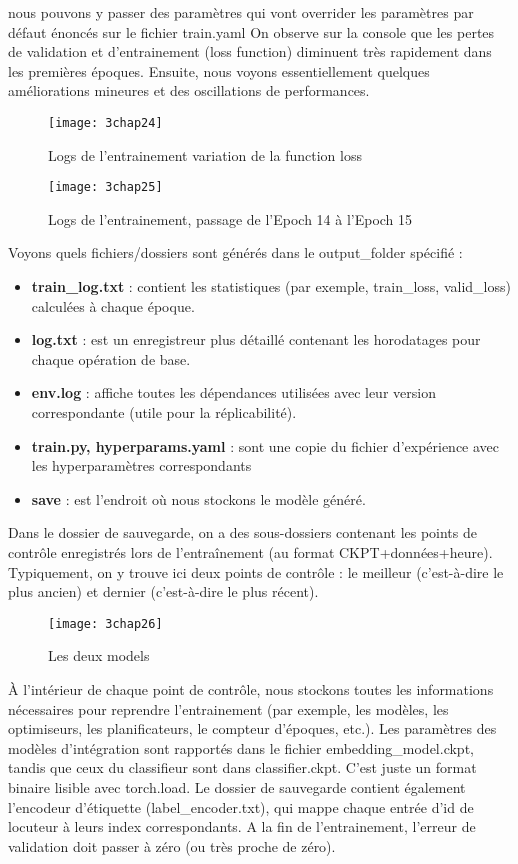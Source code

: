 nous pouvons y passer des paramètres qui vont overrider les paramètres par défaut énoncés sur le fichier train.yaml
On observe sur la console que les pertes de validation et d’entrainement (loss function) diminuent très rapidement dans les premières époques. Ensuite, nous voyons essentiellement quelques améliorations mineures et des oscillations de performances.
\begin{figure}[h]
	\centering
	\texttt{[image: 3chap24]}
	\caption{Logs de l’entrainement variation de la function loss}
	\label{fig:3chap24}
\end{figure}

\begin{figure}[h]
	\centering
	\texttt{[image: 3chap25]}
	\caption{Logs de l’entrainement, passage de l’Epoch 14 à l’Epoch 15}
	\label{fig:3chap25}
\end{figure}

Voyons quels fichiers/dossiers sont générés dans le output\_folder spécifié :
\begin{itemize}
    \item \textbf{train\_log.txt} : contient les statistiques (par exemple, train\_loss, valid\_loss) calculées à chaque époque.
    \item \textbf{log.txt} : est un enregistreur plus détaillé contenant les horodatages pour chaque opération de base.
    \item \textbf{env.log} : affiche toutes les dépendances utilisées avec leur version correspondante (utile pour la réplicabilité).
    \item \textbf{train.py, hyperparams.yaml }: sont une copie du fichier d'expérience avec les hyperparamètres correspondants 
    \item \textbf{save} : est l'endroit où nous stockons le modèle généré.

\end{itemize}

Dans le dossier de sauvegarde, on a des sous-dossiers contenant les points de contrôle enregistrés lors de l'entraînement (au format CKPT+données+heure). Typiquement, on y trouve ici deux points de contrôle : le meilleur (c'est-à-dire le plus ancien) et dernier (c'est-à-dire le plus récent). 
\begin{figure}[h]
	\centering
	\texttt{[image: 3chap26]}
	\caption{Les deux models }
	\label{fig:3chap26}
\end{figure}

À l'intérieur de chaque point de contrôle, nous stockons toutes les informations nécessaires pour reprendre l’entrainement (par exemple, les modèles, les optimiseurs, les planificateurs, le compteur d'époques, etc.). Les paramètres des modèles d'intégration sont rapportés dans le fichier embedding\_model.ckpt, tandis que ceux du classifieur sont dans classifier.ckpt. C'est juste un format binaire lisible avec torch.load.
Le dossier de sauvegarde contient également l'encodeur d'étiquette (label\_encoder.txt), qui mappe chaque entrée d'id de locuteur à leurs index correspondants.
A la fin de l’entrainement, l'erreur de validation doit passer à zéro (ou très proche de zéro).


